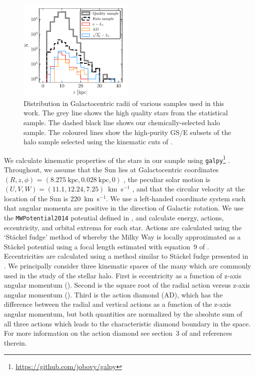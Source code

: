 \begin{figure}
    \centering
    \includegraphics[width=0.5\textwidth]{figure/ch3/radius_histogram.pdf}
    \caption{Distribution in Galactocentric radii of various samples used in this work. The grey line shows the high quality stars from the statistical sample. The dashed black line shows our chemically-selected halo sample. The coloured lines show the high-purity GS/E subsets of the halo sample selected using the kinematic cuts of \cite{lane22}.}
    \label{ch3:fig:radius_histogram}
\end{figure}

We calculate kinematic properties of the stars in our sample using \texttt{galpy}\footnote{\url{https://github.com/jobovy/galpy}} \parencite{bovy15}. Throughout, we assume that the Sun lies at Galactocentric coordinates $(R,z,\phi)$ = $(8.275~\text{kpc}, 0.028~\text{kpc}, 0)$ \parencite{gravity21,bennett19}, the peculiar solar motion is $(U,V,W) = (11.1, 12.24, 7.25)$~km~s$^{-1}$ \parencite{schoenrich10}, and that the circular velocity at the location of the Sun is 220~km~s$^{-1}$. We use a left-handed coordinate system such that angular momenta are positive in the direction of Galactic rotation. We use the \texttt{MWPotential2014} potential defined in \textcite{bovy15}, and calculate energy, actions, eccentricity, and orbital extrema for each star. Actions are calculated using the `St\"{a}ckel fudge' method of \textcite{binney12} whereby the Milky Way is locally approximated as a St\"{a}ckel potential using a focal length estimated with equation~9 of \textcite{sanders12}. Eccentricities are calculated using a method similar to St\"{a}ckel fudge presented in \textcite{mackereth18c}. We principally consider three kinematic spaces of the many which are commonly used in the study of the stellar halo. First is eccentricity as a function of z-axis angular momentum (\eLz). Second is the square root of the radial action versus z-axis angular momentum (\JRLz). Third is the action diamond (AD), which has the difference between the radial and vertical actions as a function of the z-axis angular momentum, but both quantities are normalized by the absolute sum of all three actions which leads to the characteristic diamond boundary in the space. For more information on the action diamond see section~3 of \cite{lane22} and references therein.

